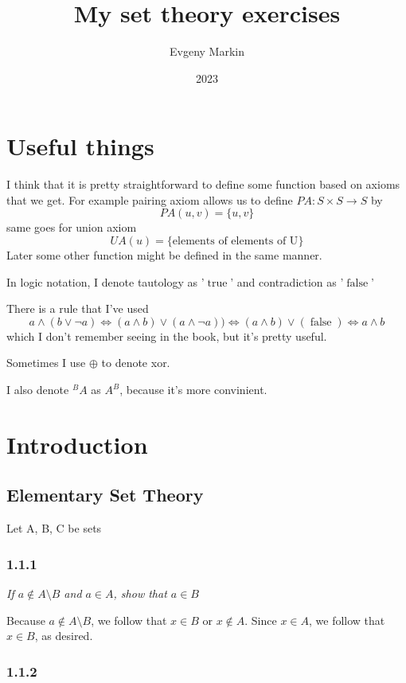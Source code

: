 \documentclass[11pt,oneside,titlepage]{book}
\title{My set theory exercises}
\author{Evgeny Markin}
\date{2023}
\DeclareMathOperator \lra {\Leftrightarrow}
\DeclareMathOperator \true {true}
\DeclareMathOperator \false {false}
\begin{document}
\maketitle
\tableofcontents

\chapter*{Useful things}

I think that it is pretty straightforward to define some function based on axioms that we get.
For example pairing axiom allows us to define $PA: S \times S \to S$ by
$$PA(u, v) = \{u, v\}$$
same goes for union axiom
$$UA(u) = \{\text{elements of elements of U}\}$$
Later some other function might be defined in the same manner.

In logic notation, I denote tautology as '$\true$' and contradiction as '$\false$'

There is a rule that I've used
$$a \land (b \lor \neg a) \lra (a \land b) \lor (a \land \neg a))
\lra (a \land b) \lor (\false) \lra a \land b$$
which I don't remember seeing in the book, but it's pretty useful.

Sometimes I use $\oplus$ to denote xor.

I also denote $^BA$ as $A^B$, because it's more convinient.

\chapter{Introduction}

\section{Elementary Set Theory}

Let A, B, C be sets

\subsection*{1.1.1}

\textit{If $a \notin A \setminus B$ and $a \in A$, show that $a \in B$}

Because $a \notin A \setminus B$, we follow that $x \in B$ or $x \notin A$. Since $x \in A$, we
follow that $x \in B$, as desired.

\subsection*{1.1.2}
\end{document}
